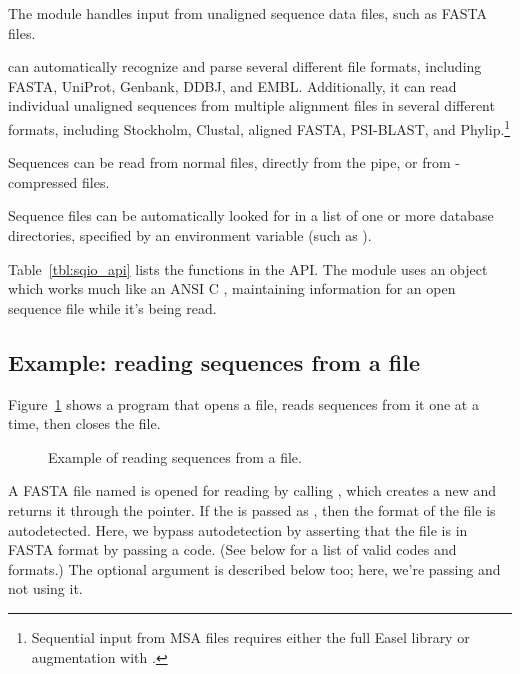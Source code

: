 The  module handles input from unaligned sequence data
files, such as FASTA files.

 can automatically recognize and parse several different
file formats, including FASTA, UniProt, Genbank, DDBJ, and EMBL.
Additionally, it can read individual unaligned sequences from multiple
alignment files in several different formats, including Stockholm,
Clustal, aligned FASTA, PSI-BLAST, and Phylip.\footnote{Sequential
  input from MSA files requires either the full Easel library or
  augmentation with .}

Sequences can be read from normal files, directly from the
 pipe, or from -compressed files.

Sequence files can be automatically looked for in a list of one or
more database directories, specified by an environment variable (such
as ).

Table~\ref{tbl:sqio_api} lists the functions in the  API.
The module uses an  object which works much like an
ANSI C , maintaining information for an open sequence file
while it's being read.

%




\subsection{Example: reading sequences from a file}

Figure~\ref{fig:sqio_example_text} shows a program that opens a file, reads
sequences from it one at a time, then closes the file.

\begin{figure}

\caption{Example of reading sequences from a file.}
\label{fig:sqio_example_text}
\end{figure}

A FASTA file named  is opened for reading by calling
, which
creates a new  and returns it through the
 pointer. If the  is passed as
, then the format of the file is
autodetected. Here, we bypass autodetection by asserting that the file
is in FASTA format by passing a  code. (See
below for a list of valid codes and formats.) The optional 
argument is described below too; here, we're passing  and
not using it.

